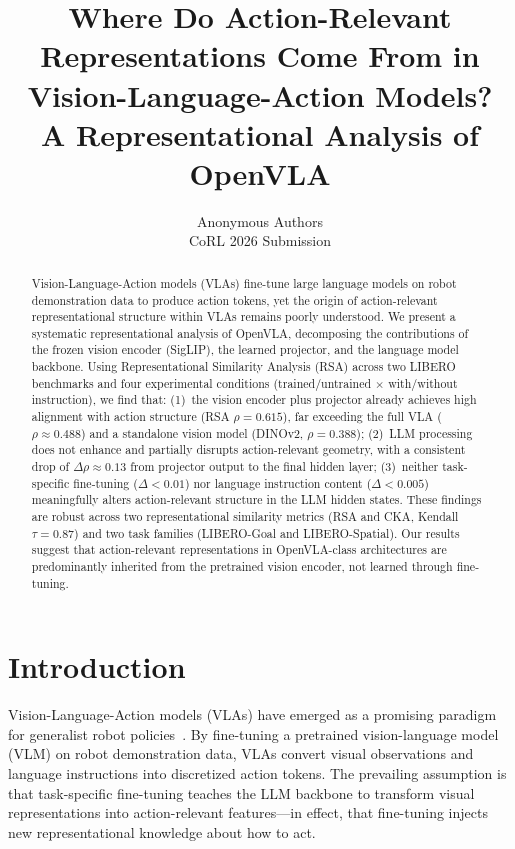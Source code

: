 \documentclass[letterpaper]{article}
\title{Where Do Action-Relevant Representations Come From in Vision-Language-Action Models?\\A Representational Analysis of OpenVLA}
\author{
Anonymous Authors\\
CoRL 2026 Submission
}
\date{}
\begin{document}
\maketitle

\begin{abstract}
Vision-Language-Action models (VLAs) fine-tune large language models on robot demonstration data to produce action tokens, yet the origin of action-relevant representational structure within VLAs remains poorly understood.
We present a systematic representational analysis of OpenVLA, decomposing the contributions of the frozen vision encoder (SigLIP), the learned projector, and the language model backbone.
Using Representational Similarity Analysis (RSA) across two LIBERO benchmarks and four experimental conditions (trained/untrained $\times$ with/without instruction), we find that:
(1)~the vision encoder plus projector already achieves high alignment with action structure (RSA $\rho=0.615$), far exceeding the full VLA ($\rho\approx0.488$) and a standalone vision model (DINOv2, $\rho=0.388$);
(2)~LLM processing does not enhance and partially disrupts action-relevant geometry, with a consistent drop of $\Delta\rho\approx0.13$ from projector output to the final hidden layer;
(3)~neither task-specific fine-tuning ($\Delta<0.01$) nor language instruction content ($\Delta<0.005$) meaningfully alters action-relevant structure in the LLM hidden states.
These findings are robust across two representational similarity metrics (RSA and CKA, Kendall $\tau=0.87$) and two task families (LIBERO-Goal and LIBERO-Spatial).
Our results suggest that action-relevant representations in OpenVLA-class architectures are predominantly inherited from the pretrained vision encoder, not learned through fine-tuning.
\end{abstract}

\section{Introduction}
\label{sec:intro}

Vision-Language-Action models (VLAs) have emerged as a promising paradigm for generalist robot policies~\citep{brohan2023rt2,kim2024openvla}.
By fine-tuning a pretrained vision-language model (VLM) on robot demonstration data, VLAs convert visual observations and language instructions into discretized action tokens.
The prevailing assumption is that task-specific fine-tuning teaches the LLM backbone to transform visual representations into action-relevant features---in effect, that fine-tuning injects new representational knowledge about how to act.
\end{document}
